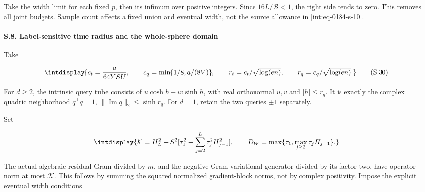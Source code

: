 
Take the width limit for each fixed \(p\), then its infimum over positive integers. Since \(16L/\mathcal B<1\), the right side tends to zero. This removes all joint budgets. Sample count affects a fixed union and eventual width, not the source allowance in \eqref{int:eq-0184-s-10}.


\paragraph{S.8. Label-sensitive time radius and the whole-sphere domain}

\mbox{}\par\smallskip


Take


\begingroup\renewcommand{\theHequation}{intdisplay.416}
\begin{equation}
\intdisplay{
c_t=\frac a{64YSU},\qquad
c_q=\min\{1/8,a/(8V)\},\qquad
r_t=c_t/\sqrt{\log(en)},\qquad r_q=c_q/\sqrt{\log(en)}.
}
\tag{S.30}
\label{int:eq-0204-s-30}
\end{equation}
\endgroup


For \(d\ge2\), the intrinsic query tube consists of \(u\cosh h+i v\sinh h\), with real orthonormal \(u,\allowbreak v\) and \(|h|\le r_q\). It is exactly the complex quadric neighborhood \(q^\top q=1\), \(\|\operatorname{Im}q\|_2\le\sinh r_q\). For \(d=1\), retain the two queries \(\pm1\) separately.



Set


\begingroup\renewcommand{\theHequation}{intdisplay.417}
\begin{equation*}
\intdisplay{
\mathcal K=H_L^2+S^2[\tau_1^2+
                    \sum_{j=2}^L\tau_j^2H_{j-1}^2],\qquad
D_W=\max\{\tau_1,\max_{j\ge2}\tau_jH_{j-1}\}.
}
\end{equation*}
\endgroup


The actual algebraic residual Gram divided by \(m\), and the negative-Gram variational generator divided by its factor two, have operator norm at most \(\mathcal K\). This follows by summing the squared normalized gradient-block norms, not by complex positivity. Impose the explicit eventual width conditions



